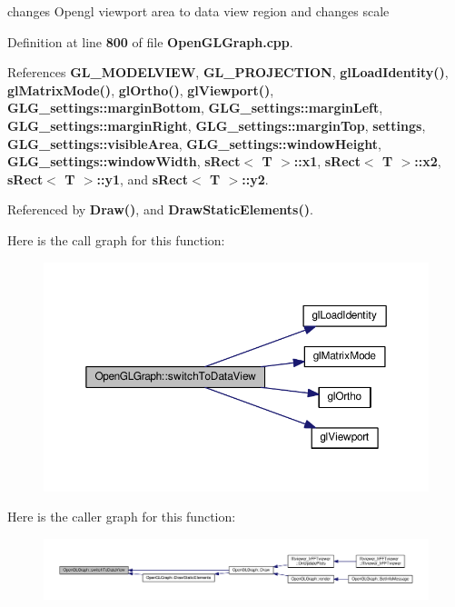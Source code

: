 changes Opengl viewport area to data view region and changes scale 



Definition at line {\bf 800} of file {\bf Open\+G\+L\+Graph.\+cpp}.



References {\bf G\+L\+\_\+\+M\+O\+D\+E\+L\+V\+I\+EW}, {\bf G\+L\+\_\+\+P\+R\+O\+J\+E\+C\+T\+I\+ON}, {\bf gl\+Load\+Identity()}, {\bf gl\+Matrix\+Mode()}, {\bf gl\+Ortho()}, {\bf gl\+Viewport()}, {\bf G\+L\+G\+\_\+settings\+::margin\+Bottom}, {\bf G\+L\+G\+\_\+settings\+::margin\+Left}, {\bf G\+L\+G\+\_\+settings\+::margin\+Right}, {\bf G\+L\+G\+\_\+settings\+::margin\+Top}, {\bf settings}, {\bf G\+L\+G\+\_\+settings\+::visible\+Area}, {\bf G\+L\+G\+\_\+settings\+::window\+Height}, {\bf G\+L\+G\+\_\+settings\+::window\+Width}, {\bf s\+Rect$<$ T $>$\+::x1}, {\bf s\+Rect$<$ T $>$\+::x2}, {\bf s\+Rect$<$ T $>$\+::y1}, and {\bf s\+Rect$<$ T $>$\+::y2}.



Referenced by {\bf Draw()}, and {\bf Draw\+Static\+Elements()}.



Here is the call graph for this function\+:
\nopagebreak
\begin{figure}[H]
\begin{center}
\leavevmode
\includegraphics[width=350pt]{d9/d73/classOpenGLGraph_ab90579284c5f5b303f68d5a34a486e2a_cgraph}
\end{center}
\end{figure}




Here is the caller graph for this function\+:
\nopagebreak
\begin{figure}[H]
\begin{center}
\leavevmode
\includegraphics[width=350pt]{d9/d73/classOpenGLGraph_ab90579284c5f5b303f68d5a34a486e2a_icgraph}
\end{center}
\end{figure}


